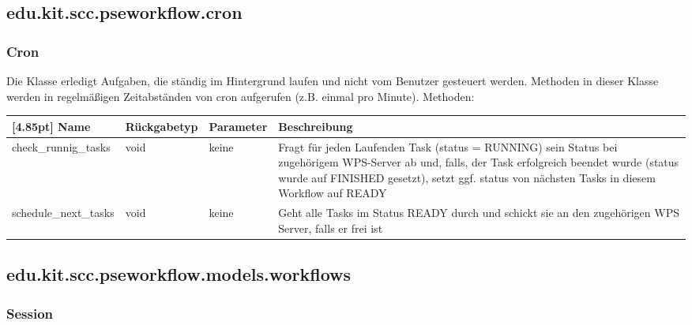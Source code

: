     \subsection{edu.kit.scc.pseworkflow.cron}

		\subsubsection{Cron}

        Die Klasse erledigt Aufgaben, die ständig im Hintergrund laufen und nicht vom Benutzer gesteuert werden. Methoden in dieser Klasse werden in regelmäßigen Zeitabständen von cron  aufgerufen (z.B. einmal pro Minute).
        \newline\newline
        Methoden:
        \begin{center}
        	\setlength\tabcolsep{5pt}
        	\renewcommand{\arraystretch}{1.5}
        	
        	\begin{tabularx}{\textwidth}{|l|l|l|X|}
        		\hline
        		\rowcolor[gray]{0.90}[4.85pt]
        		Name & Rückgabetyp & Parameter & Beschreibung \\ \hline
        		check_runnig_tasks & void & keine & Fragt für jeden Laufenden Task (status = RUNNING) sein Status bei zugehörigem WPS-Server ab und, falls, der Task erfolgreich beendet wurde (status wurde auf FINISHED gesetzt), setzt ggf. status von nächsten Tasks in diesem Workflow auf READY \\ \hline
        		schedule_next_tasks & void & keine & Geht alle Tasks im Status READY durch und schickt sie an den zugehörigen WPS Server, falls er frei ist \\ \hline
        	\end{tabularx}
        \end{center}


    \subsection{edu.kit.scc.pseworkflow.models.workflows}
    
        \subsubsection{Session}
        
